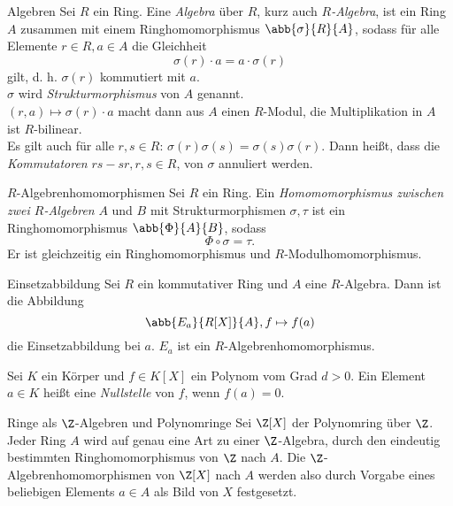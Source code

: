\begin{karte}{Algebren}
    Sei \(R\) ein Ring. Eine \textit{Algebra} über \(R\), 
    kurz auch \textit{\(R\)-Algebra}, ist ein Ring \(A\) 
    zusammen mit einem Ringhomomorphismus 
    \( \abb{\sigma}{R}{A} \), sodass für alle Elemente 
    \(r\in R, a\in A\) die Gleichheit 
    \[ \sigma(r) \cdot a = a \cdot \sigma(r) \]
    gilt, d. h. \(\sigma(r)\) kommutiert mit \(a\).\\
    \(\sigma\) wird \textit{Strukturmorphismus} von \(A\) genannt. \\
    \((r,a) \mapsto \sigma(r) \cdot a\) macht dann aus \(A\) einen \(R\)-Modul, 
    die Multiplikation in \(A\) ist \(R\)-bilinear.\\
    Es gilt auch für alle \(r,s\in R\): \(\sigma(r) \sigma(s) = \sigma(s) \sigma(r)\). 
    Dann heißt, dass die \textit{Kommutatoren} \(rs - sr, r,s\in R\), 
    von \(\sigma\) annuliert werden. 
\end{karte}

\begin{karte}{\(R\)-Algebrenhomomorphismen}
    Sei \(R\) ein Ring. Ein \textit{Homomomorphismus zwischen zwei \(R\)-Algebren} 
    \(A\) und \(B\) mit Strukturmorphismen \(\sigma, \tau\) ist ein 
    Ringhomomorphismus \(\abb{\Phi}{A}{B}\), sodass 
    \[ \Phi \circ \sigma = \tau. \]
    Er ist gleichzeitig ein Ringhomomorphismus und \(R\)-Modulhomomorphismus.
\end{karte}

\begin{karte}{Einsetzabbildung}
    Sei \(R\) ein kommutativer Ring und \(A\) eine \(R\)-Algebra. 
    Dann ist die Abbildung 
    \[ \abb{E_a}{R[X]}{A}, f \mapsto f(a) \]
    die Einsetzabbildung bei \(a\). 
    \(E_a\) ist ein \(R\)-Algebrenhomomorphismus. 

    Sei \(K\) ein Körper und \(f\in K[X]\) ein Polynom vom Grad \(d>0\).
    Ein Element \(a\in K\) heißt eine \textit{Nullstelle} von \(f\), 
    wenn \(f(a) = 0\).
\end{karte}

\begin{karte}{Ringe als \(\Z\)-Algebren und Polynomringe}
    Sei \(\Z[X]\) der Polynomring über \(\Z\). Jeder Ring \(A\) 
    wird auf genau eine Art zu einer \(\Z\)-Algebra, durch den 
    eindeutig bestimmten Ringhomomorphismus von \(\Z\) nach \(A\).
    Die \(\Z\)-Algebrenhomomorphismen von \(\Z[X]\) nach \(A\) 
    werden also durch Vorgabe eines beliebigen Elements \(a\in A\) 
    als Bild von \(X\) festgesetzt.
\end{karte}

